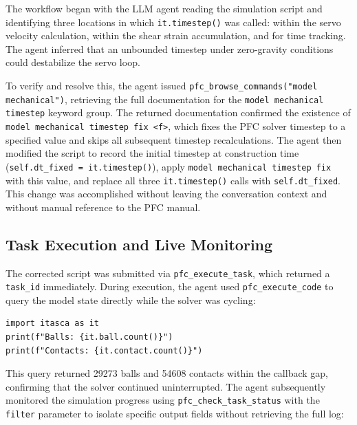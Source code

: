 The workflow began with the LLM agent reading the simulation script and identifying three locations in which \texttt{it.timestep()} was called: within the servo velocity calculation, within the shear strain accumulation, and for time tracking. The agent inferred that an unbounded timestep under zero-gravity conditions could destabilize the servo loop.

To verify and resolve this, the agent issued \texttt{pfc\_browse\_commands("model mechanical")}, retrieving the full documentation for the \texttt{model mechanical timestep} keyword group. The returned documentation confirmed the existence of \texttt{model mechanical timestep fix <f>}, which fixes the PFC solver timestep to a specified value and skips all subsequent timestep recalculations. The agent then modified the script to record the initial timestep at construction time (\texttt{self.dt\_fixed = it.timestep()}), apply \texttt{model mechanical timestep fix} with this value, and replace all three \texttt{it.timestep()} calls with \texttt{self.dt\_fixed}. This change was accomplished without leaving the conversation context and without manual reference to the PFC manual.

\subsection{Task Execution and Live Monitoring}
\label{sec:demo:monitoring}


The corrected script was submitted via \texttt{pfc\_execute\_task}, which returned a \texttt{task\_id} immediately. During execution, the agent used \texttt{pfc\_execute\_code} to query the model state directly while the solver was cycling:

\begin{verbatim}
import itasca as it
print(f"Balls: {it.ball.count()}")
print(f"Contacts: {it.contact.count()}")
\end{verbatim}

This query returned \num{29273} balls and \num{54608} contacts within the callback gap, confirming that the solver continued uninterrupted. The agent subsequently monitored the simulation progress using \texttt{pfc\_check\_task\_status} with the \texttt{filter} parameter to isolate specific output fields without retrieving the full log:


